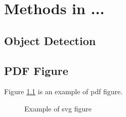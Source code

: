 \chapter{Methods in ...}

\section{Object Detection}








\section{PDF Figure}
Figure \ref{fig:example_svg} is an example of pdf figure.

\begin{figure}[H]
  \centering
  
  \caption{Example of svg figure}
  \label{fig:example_svg}
\end{figure}

